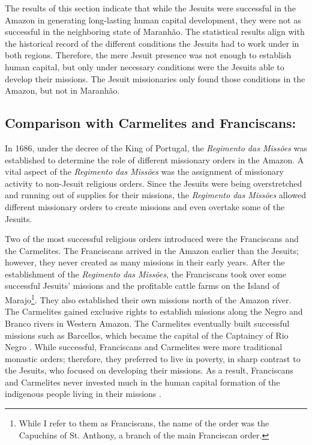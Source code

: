 \documentclass{article}
\begin{document}
The results of this section indicate that while the Jesuits were successful in the Amazon in generating long-lasting human capital development, they were not as successful in the neighboring state of Maranhão. 
The statistical results align with the historical record of the different conditions the Jesuits had to work under in both regions.
Therefore, the mere Jesuit presence was not enough to establish human capital, but only under necessary conditions were the Jesuits able to develop their missions. 
The Jesuit missionaries only found those conditions in the Amazon, but not in Maranhão.


\subsection{Comparison with Carmelites and Franciscans:}

In 1686, under the decree of the King of Portugal, the \textit{Regimento das Missões} was established to determine the role of different missionary orders in the Amazon. 
A vital aspect of the \textit{Regimento das Missões} was the assignment of missionary activity to non-Jesuit religious orders. 
Since the Jesuits were being overstretched and running out of supplies for their missions, the \textit{Regimento das Missões} allowed different missionary orders to create missions and even overtake some of the Jesuits.

Two of the most successful religious orders introduced were the Franciscans and the Carmelites. 
The Franciscans arrived in the Amazon earlier than the Jesuits; however, they never created as many missions in their early years.
After the establishment of the \textit{Regimento das Missões}, the Franciscans took over some successful Jesuits' missions and the profitable cattle farms on the Island of Marajo\footnote{
  While I refer to them as Franciscans, the name of the order was the Capuchins of St. Anthony, a branch of the main Franciscan order.}. 
They also established their own missions north of the Amazon river.
The Carmelites gained exclusive rights to establish missions along the Negro and Branco rivers in Western Amazon. 
The Carmelites eventually built successful missions such as Barcellos, which became the capital of the Captaincy of Rio Negro \parencite{Perdigao2020-fk}. 
While successful, Franciscans and Carmelites were more traditional monastic orders; therefore, they preferred to live in poverty, in sharp contrast to the Jesuits, who focused on developing their missions. 
As a result, Franciscans and Carmelites never invested much in the human capital formation of the indigenous people living in their missions \parencite[p.~288]{Azevedo1943-gs}.
\end{document}
